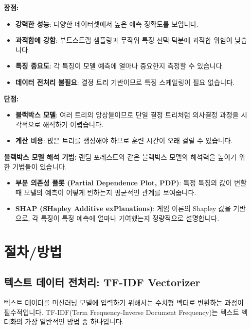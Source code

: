 \documentclass[11pt,a4paper]{article}
\theoremstyle{definition}
\begin{document}
\textbf{장점:}
\begin{itemize}
    \item \textbf{강력한 성능}: 다양한 데이터셋에서 높은 예측 정확도를 보입니다.
    \item \textbf{과적합에 강함}: 부트스트랩 샘플링과 무작위 특징 선택 덕분에 과적합 위험이 낮습니다.
    \item \textbf{특징 중요도}: 각 특징이 모델 예측에 얼마나 중요한지 측정할 수 있습니다.
    \item \textbf{데이터 전처리 불필요}: 결정 트리 기반이므로 특징 스케일링이 필요 없습니다.
\end{itemize}

\textbf{단점:}
\begin{itemize}
    \item \textbf{블랙박스 모델}: 여러 트리의 앙상블이므로 단일 결정 트리처럼 의사결정 과정을 시각적으로 해석하기 어렵습니다.
    \item \textbf{계산 비용}: 많은 트리를 생성해야 하므로 훈련 시간이 오래 걸릴 수 있습니다.
\end{itemize}

\textbf{블랙박스 모델 해석 기법:}
랜덤 포레스트와 같은 블랙박스 모델의 해석력을 높이기 위한 기법들이 있습니다.
\begin{itemize}
    \item \textbf{부분 의존성 플롯 (Partial Dependence Plot, PDP)}: 특정 특징의 값이 변할 때 모델의 예측이 어떻게 변하는지 평균적인 관계를 보여줍니다.
    \item \textbf{SHAP (SHapley Additive exPlanations)}: 게임 이론의 Shapley 값을 기반으로, 각 특징이 특정 예측에 얼마나 기여했는지 정량적으로 설명합니다.
\end{itemize}

\newpage
\section*{절차/방법}

\subsection{텍스트 데이터 전처리: TF-IDF Vectorizer}

텍스트 데이터를 머신러닝 모델에 입력하기 위해서는 수치형 벡터로 변환하는 과정이 필수적입니다. TF-IDF(Term Frequency-Inverse Document Frequency)는 텍스트 벡터화의 가장 일반적인 방법 중 하나입니다.
\end{document}
